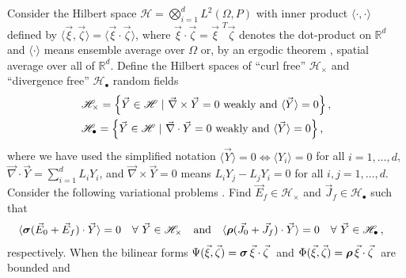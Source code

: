 \documentclass{cmslatex}
\newcommand\bsig{\mbox{\boldmath${\sigma}$}}
\newcommand\brho{\mbox{\boldmath${\rho}$}}
\begin{document}
Consider the Hilbert space $\mathscr{H}=\bigotimes_{i=1}^dL^2(\Omega,P)$ with inner
product $\langle\cdot,\cdot\rangle$ defined by $\langle\vec{\xi},\vec{\zeta}\rangle=\langle\vec{\xi}\cdot\vec{\zeta}\rangle$, where
$\vec{\xi}\cdot\vec{\zeta}=\vec{\xi}^{\;\,T}\vec{\zeta}$ denotes the dot-product 
on $\mathbb{R}^d$ and $\langle\cdot\rangle$ means ensemble average over $\Omega$ or, by an
ergodic theorem \cite{Golden:CMP-473}, spatial average over all of
${\mathbb{R}}^d$. Define the Hilbert spaces \cite{Golden:CMP-473} of
``curl free'' $\mathscr{H}_\times$ and ``divergence free''
$\mathscr{H}_{\bullet}$ random fields  
%
\begin{align}\label{eq:curlfreeHilbert}
  &\mathscr{H}_\times=
  \left\{\vec{Y}\in \mathscr{H} \ | \ \vec{\nabla} \times\vec{Y}=0 \text{ weakly and }
    \langle\vec{Y}\rangle=0
  \right\}, \\
&\mathscr{H}_{\bullet}=
\left\{\vec{Y}\in \mathscr{H} \ | \ \vec{\nabla}\cdot\vec{Y}=0 \text{ weakly and }
    \langle\vec{Y}\rangle=0\right\},\notag 
\end{align}  
%
%
where we have used the simplified notation $\langle\vec{Y}\rangle=0 \iff \langle Y_i\rangle=0$ for
all $i=1,\ldots,d$, $\vec{\nabla}\cdot\vec{Y}=\sum_{i=1}^dL_iY_i$, and $\vec{\nabla} \times\vec{Y}=0$
means $L_iY_j-L_jY_i=0$ for all $i,j=1,\ldots,d$. Consider the following
variational problems \cite{Golden:CMP-473}. Find
$\vec{E}_f\in\mathscr{H}_\times$ and $\vec{J}_f\in\mathscr{H}_\bullet$ such that     
%
\begin{align}
 \label{eq:Weak_Curl_Free_Variational_Form}
 &\langle\bsig(\vec{E}_0+\vec{E}_f)\cdot\vec{Y}\rangle=0 \quad  \forall \
  \vec{Y}\in\mathscr{H}_\times &&\text{and}
%
 &&\langle\brho(\vec{J}_0+\vec{J}_f)\cdot\vec{Y}\rangle=0 \quad  \forall \
  \vec{Y}\in\mathscr{H}_{\bullet}\,,  
\end{align}
%
respectively. When the bilinear forms
$\Psi(\vec{\xi},\vec{\zeta})=\bsig\,\vec{\xi}\cdot\vec{\zeta}\;$ and
$\Phi(\vec{\xi},\vec{\zeta})=\brho\,\vec{\xi}\cdot\vec{\zeta}\;$ are bounded and
\end{document}
